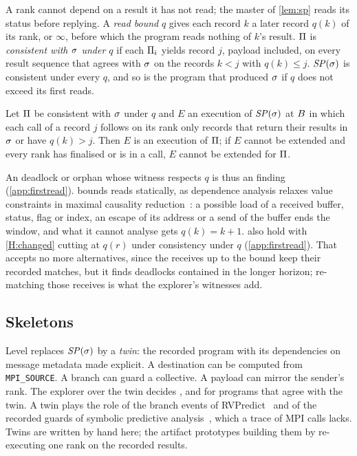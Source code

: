 A rank cannot depend on a result it has not read; the master of \cref{lem:sp} reads its status
before replying. A \emph{read bound} $q$ gives each record $k$ a later record $q(k)$ of its
rank, or $\infty$, before which the program reads nothing of $k$'s result. $\Pi$ is
\emph{consistent with $\sigma$ under $q$} if each $\Pi_i$ yields record $j$, payload
included, on every result sequence that agrees with $\sigma$ on the records $k<j$ with
$q(k)\le j$. $\mathit{SP}(\sigma)$ is consistent under every $q$, and so is the program that produced
$\sigma$ if $q$ does not exceed its first reads.

\begin{theorem}
\label{thm:firstread}
Let $\Pi$ be consistent with $\sigma$ under $q$ and $E$ an execution of $\mathit{SP}(\sigma)$ at
$B$ in which each call of a record $j$ follows on its rank only records that return their
results in $\sigma$ or have $q(k)>j$. Then $E$ is an execution of $\Pi$; if $E$ cannot be
extended and every rank has finalised or is in a call, $E$ cannot be extended for $\Pi$.
\end{theorem}

\noindent An \LoneSP deadlock or orphan whose witness respects $q$ is thus an \Lone finding
(\cref{app:firstread}). \tool bounds reads statically, as dependence analysis relaxes value
constraints in maximal causality reduction~\citep{huang17mcrsdg}: a possible load of a
received buffer, status, flag or index, an escape of its address or a send of the buffer ends
the window, and what it cannot analyse gets $q(k)=k+1$.  also
hold with \ref{H:changed} cutting at $q(r)$ under consistency under $q$ (\cref{app:firstread}).
That accepts no more alternatives, since the receives up to the bound keep their recorded
matches, but it finds deadlocks contained in the longer horizon; re-matching those receives is
what the explorer's witnesses add.

\subsection{Skeletons}

Level \Ltwo replaces $\mathit{SP}(\sigma)$ by a \emph{twin}: the recorded program with its
dependencies on message metadata made explicit. A destination can be computed from
\texttt{MPI\_SOURCE}. A branch can guard a collective. A payload can mirror the sender's
rank. The explorer over the twin decides ,  and  for programs
that agree with the twin. A twin plays the role of the branch events of
RVPredict~\citep{huang14rvpredict} and of the recorded guards of symbolic predictive
analysis~\citep{wang09ctp}, which a trace of MPI calls lacks. Twins are written by hand here;
the artifact prototypes building them by re-executing one rank on the recorded results.


